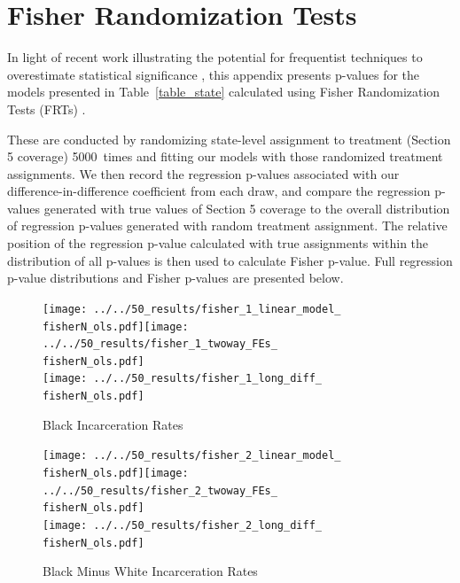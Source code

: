 \documentclass[12pt]{article}
\begin{document}
\section{Fisher Randomization Tests}\label{appendix_fisher}
\setcounter{table}{0}
\setcounter{figure}{0}
\renewcommand{\thetable}{J\arabic{table}}
\renewcommand{\thefigure}{J\arabic{figure}}
\normalsize

\newcommand{\fisherN}{5000}

In light of recent work illustrating the potential for frequentist techniques to overestimate statistical significance \citep{Young:2019jx}, this appendix presents p-values for the models presented in Table~\ref{table_state} calculated using Fisher Randomization Tests (FRTs) \cite{Fisher:1935uc}.

These are conducted by randomizing state-level assignment to treatment (Section 5 coverage) \fisherN\ times and fitting our models with those randomized treatment assignments. We then record the regression p-values associated with our difference-in-difference coefficient from each draw, and compare the regression p-values generated with true values of Section 5 coverage to the overall distribution of regression p-values generated with random treatment assignment. The relative position of the regression p-value calculated with true assignments within the distribution of all p-values is then used to calculate Fisher p-value. Full regression p-value distributions and Fisher p-values are presented below.

\begin{figure}[bh!]
	\centering
	\caption{Black Incarceration Rates}\label{figure_fisher1}
	\texttt{[image: ../../50\_results/fisher\_1\_linear\_model\_\\fisherN\_ols.pdf]}\texttt{[image: ../../50\_results/fisher\_1\_twoway\_FEs\_\\fisherN\_ols.pdf]}\\
	\texttt{[image: ../../50\_results/fisher\_1\_long\_diff\_\\fisherN\_ols.pdf]}
\end{figure}


\begin{figure}[bh!]
	\centering
	\caption{Black Minus White Incarceration Rates}\label{figure_fisher2}
	\texttt{[image: ../../50\_results/fisher\_2\_linear\_model\_\\fisherN\_ols.pdf]}\texttt{[image: ../../50\_results/fisher\_2\_twoway\_FEs\_\\fisherN\_ols.pdf]}\\
	\texttt{[image: ../../50\_results/fisher\_2\_long\_diff\_\\fisherN\_ols.pdf]}
\end{figure}
\end{document}
